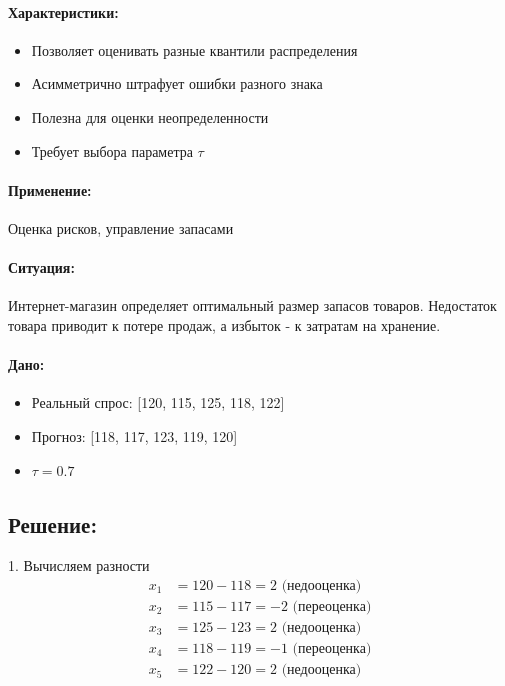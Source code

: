\paragraph{Характеристики:}
\begin{itemize}
    \item Позволяет оценивать разные квантили распределения
    \item Асимметрично штрафует ошибки разного знака
    \item Полезна для оценки неопределенности
    \item Требует выбора параметра $\tau$
\end{itemize}

\paragraph{Применение:} Оценка рисков, управление запасами

\paragraph{Ситуация:} Интернет-магазин определяет оптимальный размер запасов товаров. Недостаток товара приводит к потере продаж, а избыток - к затратам на хранение.

\paragraph{Дано:}
\begin{itemize}
    \item Реальный спрос: [120, 115, 125, 118, 122]
    \item Прогноз: [118, 117, 123, 119, 120]
    \item $\tau = 0.7$
\end{itemize}

\subsection*{Решение:}
1. Вычисляем разности
\[
\begin{aligned}
x_1 &= 120 - 118 = 2 \text{ (недооценка)} \\
x_2 &= 115 - 117 = -2 \text{ (переоценка)} \\
x_3 &= 125 - 123 = 2 \text{ (недооценка)} \\
x_4 &= 118 - 119 = -1 \text{ (переоценка)} \\
x_5 &= 122 - 120 = 2 \text{ (недооценка)}
\end{aligned}
\]

